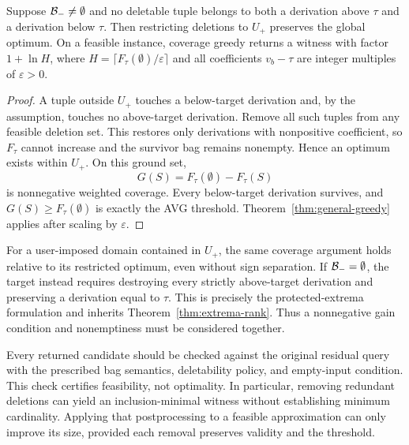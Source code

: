 \begin{proposition}
\label{prop:avg-separated}
Suppose $\mathcal{B}_-\ne\emptyset$ and no deletable tuple belongs to both a
derivation above $\tau$ and a derivation below $\tau$. Then restricting
deletions to $U_+$ preserves the global optimum. On a feasible instance,
coverage greedy returns a witness with factor $1+\ln H$, where
$H=\lceil F_\tau(\emptyset)/\varepsilon\rceil$ and all coefficients
$v_b-\tau$ are integer multiples of $\varepsilon>0$.
\end{proposition}
\begin{proof}
A tuple outside $U_+$ touches a below-target derivation and, by the
assumption, touches no above-target derivation. Remove all such tuples
from any feasible deletion set. This restores only derivations with
nonpositive coefficient, so $F_\tau$ cannot increase and the survivor
bag remains nonempty. Hence an optimum exists within $U_+$.
On this ground set,
\[
G(S)=F_\tau(\emptyset)-F_\tau(S)
\]
is nonnegative weighted coverage. Every below-target derivation survives,
and $G(S)\ge F_\tau(\emptyset)$ is exactly the AVG threshold.
Theorem~\ref{thm:general-greedy} applies after scaling by $\varepsilon$.
\end{proof}
For a user-imposed domain contained in $U_+$, the same coverage argument
holds relative to its restricted optimum, even without sign separation.
If $\mathcal{B}_-=\emptyset$, the target instead requires destroying every
strictly above-target derivation and preserving a derivation equal to
$\tau$. This is precisely the protected-extrema formulation and inherits
Theorem~\ref{thm:extrema-rank}. Thus a nonnegative gain condition and
nonemptiness must be considered together.

Every returned candidate should be checked against the original residual
query with the prescribed bag semantics, deletability policy, and empty-input
condition. This check certifies feasibility, not optimality. In particular,
removing redundant deletions can yield an inclusion-minimal witness without
establishing minimum cardinality. Applying that postprocessing to a feasible
approximation can only improve its size, provided each removal preserves
validity and the threshold.
